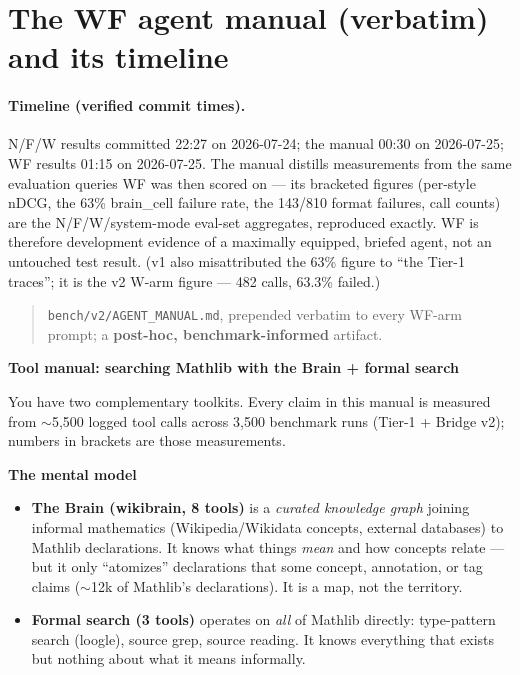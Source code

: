\documentclass[10pt]{article}
\newcommand{\code}[1]{\texttt{#1}}
\begin{document}
\section{The WF agent manual (verbatim) and its timeline}\label{s8}

\paragraph{Timeline (verified commit times).} N/F/W results committed
22:27 on 2026-07-24; the manual 00:30 on 2026-07-25; WF results 01:15
on 2026-07-25. The manual distills measurements from the same
evaluation queries WF was then scored on --- its bracketed figures
(per-style nDCG, the 63\% brain\_cell failure rate, the 143/810 format
failures, call counts) are the N/F/W/system-mode eval-set aggregates,
reproduced exactly. WF is therefore development evidence of a
maximally equipped, briefed agent, not an untouched test result. (v1
also misattributed the 63\% figure to ``the Tier-1 traces''; it is the
v2 W-arm figure --- 482 calls, 63.3\% failed.)

\begin{quote}\small
\code{bench/v2/AGENT\_MANUAL.md}, prepended verbatim to every WF-arm
prompt; a \textbf{post-hoc, benchmark-informed} artifact.
\end{quote}

\begingroup\footnotesize
\newcommand{\mhead}[1]{\par\medskip\noindent\textbf{#1}\par\smallskip}
\newcommand{\mtool}[1]{\par\smallskip\noindent\textit{#1}\par\nobreak}

\mhead{Tool manual: searching Mathlib with the Brain + formal search}

You have two complementary toolkits. Every claim in this manual is
measured from $\sim$5,500 logged tool calls across 3,500 benchmark runs
(Tier-1 + Bridge v2); numbers in brackets are those measurements.

\mhead{The mental model}

\begin{itemize}
\item \textbf{The Brain (wikibrain, 8 tools)} is a \emph{curated
  knowledge graph} joining informal mathematics (Wikipedia/Wikidata
  concepts, external databases) to Mathlib declarations. It knows what
  things \emph{mean} and how concepts relate --- but it only
  ``atomizes'' declarations that some concept, annotation, or tag
  claims ($\sim$12k of Mathlib's declarations). It is a map, not the
  territory.
\item \textbf{Formal search (3 tools)} operates on \emph{all} of
  Mathlib directly: type-pattern search (loogle), source grep, source
  reading. It knows everything that exists but nothing about what it
  means informally.
\end{itemize}
\end{document}

